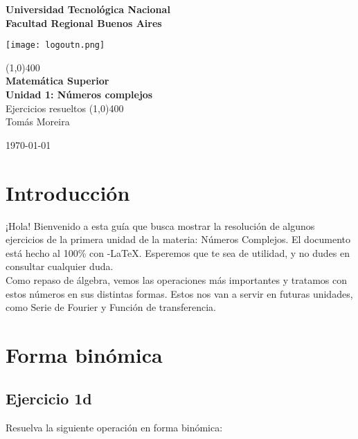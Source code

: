 \documentclass[11pt]{article}
\begin{document}
		
	\begin{titlepage}
		\begin{center}
			\vspace*{0.5cm}
			\Large{\textbf{Universidad Tecnológica Nacional}}\\
			\Large{\textbf{Facultad Regional Buenos Aires}}\\
			\begin{center}
				\texttt{[image: logoutn.png]}
			\end{center}
			\vfill
			\line(1,0){400}\\
			\vspace*{0.3cm}
			\huge{\textbf{Matemática Superior}}\\
			\Large{\textbf{Unidad 1: Números complejos}}\\
			\large{Ejercicios resueltos}
			\line(1,0){400}\\
			\vfill
			Tomás Moreira \\
			
			
			\today
				
				
		\end{center}
	\end{titlepage}

	\tableofcontents
	\thispagestyle{empty}
	\clearpage

	\setcounter{page}{1}
	\section{Introducción}
	¡Hola! Bienvenido a esta guía que busca mostrar la resolución de algunos ejercicios de la primera unidad de la materia: Números Complejos.
	El documento está hecho al 100\% con \AmS-\LaTeX. Esperemos que te sea de utilidad, y no dudes en consultar cualquier duda.\\
	Como repaso de álgebra, vemos las operaciones más importantes y tratamos con estos números en sus distintas formas. Estos nos van a servir
	en futuras unidades, como Serie de Fourier y Función de transferencia.
	\section{Forma binómica}
	\subsection{Ejercicio 1d}
		Resuelva la siguiente operación en forma binómica:
		
\end{document}
